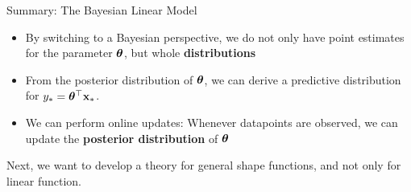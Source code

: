 \documentclass[11pt,compress,t,notes=noshow, xcolor=table]{beamer}
\begin{document}


\begin{vbframe}{Summary: The Bayesian Linear Model}

\begin{itemize}
  \item By switching to a Bayesian perspective, we do not only have point estimates for the parameter $\bm{\theta}$, but whole \textbf{distributions}
  \item From the posterior distribution of $\bm{\theta}$, we can derive a predictive distribution for $y_* = \bm{\theta}^\top \mathbf{x}_*$.  
  \item We can perform online updates: Whenever datapoints are observed, we can update the \textbf{posterior distribution} of $\bm{\theta}$
\end{itemize}

Next, we want to develop a theory for general shape functions, and not only for linear function. 

\end{vbframe}







% 
% 
% 
% 
% 
% 
% 
% 
% 
\end{document}
